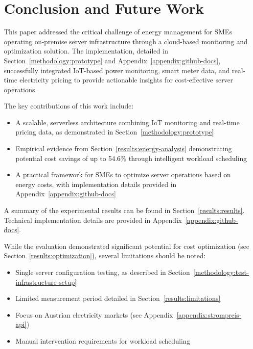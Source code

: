 


\section{Conclusion and Future Work}
\label{conclusion:conclusion}
This paper addressed the critical challenge of energy management for SMEs operating on-premise server infrastructure through a cloud-based monitoring and optimization solution. The implementation, detailed in Section~\ref{methodology:prototype} and Appendix~\ref{appendix:github-docs}, successfully integrated IoT-based power monitoring, smart meter data, and real-time electricity pricing to provide actionable insights for cost-effective server operations.

The key contributions of this work include:
\begin{itemize}
    \item A scalable, serverless architecture combining IoT monitoring and real-time pricing data, as demonstrated in Section~\ref{methodology:prototype}
    \item Empirical evidence from Section~\ref{results:energy-analysis} demonstrating potential cost savings of up to 54.6\% through intelligent workload scheduling
    \item A practical framework for SMEs to optimize server operations based on energy costs, with implementation details provided in Appendix~\ref{appendix:github-docs}
\end{itemize}

A summary of the experimental results can be found in Section~\ref{results:results}. Technical implementation details are provided in Appendix~\ref{appendix:github-docs}.

While the evaluation demonstrated significant potential for cost optimization (see Section~\ref{results:optimization}), several limitations should be noted:
\begin{itemize}
    \item Single server configuration testing, as described in Section~\ref{methodology:test-infrastructure-setup}
    \item Limited measurement period detailed in Section~\ref{results:limitations}
    \item Focus on Austrian electricity markets (see Appendix~\ref{appendix:strompreis-api})
    \item Manual intervention requirements for workload scheduling
\end{itemize}

